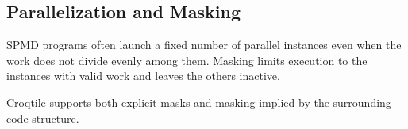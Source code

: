 \subsection*{Parallelization and Masking}

SPMD programs often launch a fixed number of parallel instances even when the work does not divide evenly among them. Masking limits execution to the instances with valid work and leaves the others inactive.

Croqtile supports both explicit masks and masking implied by the surrounding code structure.
